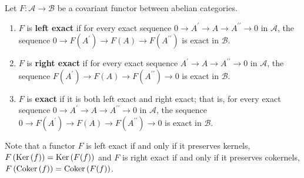 \documentclass[12pt, oneside]{book}
\begin{document}
\begin{definition}
    Let $F:\mathcal{A} \rightarrow \mathcal{B}$ be a covariant functor between abelian categories.
    \begin{enumerate}
        \item
              $F$ is \textbf{left exact} if for every exact sequence $0 \rightarrow A^{\prime} \rightarrow A \rightarrow A^{\prime \prime}\rightarrow 0$ in $\mathcal{A}$, the sequence $0 \rightarrow F\left(A^{\prime}\right) \rightarrow F(A) \rightarrow F\left(A^{\prime \prime}\right)$ is exact in $\mathcal{B}$.
        \item
              $F$ is \textbf{right exact} if for every exact sequence $A^{\prime} \rightarrow A \rightarrow A^{\prime \prime} \rightarrow 0$ in $\mathcal{A}$, the sequence $F\left(A^{\prime}\right) \rightarrow F(A) \rightarrow F\left(A^{\prime \prime}\right) \rightarrow 0$ is exact in $\mathcal{B}$.
        \item
              $F$ is \textbf{exact} if it is both left exact and right exact; that is, for every exact sequence $0 \rightarrow A^{\prime} \rightarrow A \rightarrow A^{\prime \prime} \rightarrow 0$ in $\mathcal{A}$, the sequence $0 \rightarrow F\left(A^{\prime}\right) \rightarrow F(A) \rightarrow F\left(A^{\prime \prime}\right) \rightarrow 0$ is exact in $\mathcal{B}$.
    \end{enumerate}
    \begin{remark}
        Note that a functor $F$ is left exact if and only if it preserves kernels, $F\left(\operatorname{\operatorname{Ker}}\left( f \right)\right)=\operatorname{\operatorname{Ker}}\left( F(f) \right)$ and $F$ is right exact if and only if it preserves cokernels, $F\left(\operatorname{\operatorname{Coker}}\left( f \right)\right)=\operatorname{\operatorname{Coker}}\left( F(f) \right)$.
    \end{remark}
\end{definition}
\end{document}
